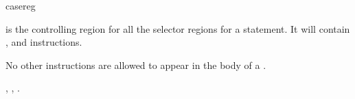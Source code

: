 \begin{instruction}{casereg}
  \begin{notes}
     is the controlling region for all the selector
    regions for a  statement.  It will contain
    ,  and
     instructions.

    No other instructions are allowed to appear in the body of a
    .
  \end{notes}

  \nresults

  \begin{operands}
  \item {}
  \end{operands}

  \begin{seealso}
    , ,
    .
  \end{seealso}
\end{instruction}
